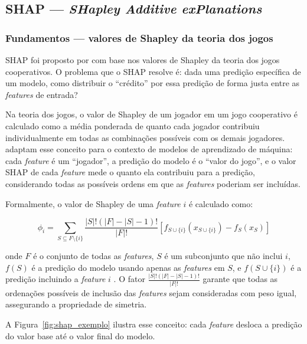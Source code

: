 \documentclass[
    12pt,                %
    openright,           %
    oneside,             %
    a4paper,             %
    english,             %
    brazil               %
]{abntex2}
\begin{document}
\subsection{SHAP — \textit{SHapley Additive exPlanations}}
\label{subsec:shap}

\subsubsection{Fundamentos — valores de Shapley da teoria dos jogos}
\label{subsubsec:shap_fundamentos}

SHAP foi proposto por  com base nos valores 
de Shapley da teoria dos jogos cooperativos. O problema que o SHAP 
resolve é: dada uma predição específica de um modelo, como distribuir 
o ``crédito'' por essa predição de forma justa entre as 
\textit{features} de entrada?

Na teoria dos jogos, o valor de Shapley de um jogador em um jogo 
cooperativo é calculado como a média ponderada de quanto cada jogador 
contribuiu individualmente em todas as combinações possíveis com os 
demais jogadores.  adaptam esse conceito 
para o contexto de modelos de aprendizado de máquina: cada 
\textit{feature} é um ``jogador'', a predição do modelo é o 
``valor do jogo'', e o valor SHAP de cada \textit{feature} mede 
o quanto ela contribuiu para a predição, considerando todas as 
possíveis ordens em que as \textit{features} poderiam ser incluídas.

Formalmente, o valor de Shapley de uma \textit{feature} $i$ 
é calculado como:

\begin{equation}
\phi_i = \sum_{S \subseteq F \setminus \{i\}} 
\frac{|S|!(|F| - |S| - 1)!}{|F|!} 
\left[ f_{S \cup \{i\}}(x_{S \cup \{i\}}) - f_S(x_S) \right]
\end{equation}

onde $F$ é o conjunto de todas as \textit{features}, $S$ é um 
subconjunto que não inclui $i$, $f(S)$ é a predição do modelo 
usando apenas as \textit{features} em $S$, e 
$f(S \cup \{i\})$ é a predição incluindo a \textit{feature} 
$i$ \cite{lundberg2017}. O fator 
$\frac{|S|!(|F| - |S| - 1)!}{|F|!}$ garante que todas as 
ordenações possíveis de inclusão das \textit{features} sejam 
consideradas com peso igual, assegurando a propriedade de 
simetria.

A Figura~\ref{fig:shap_exemplo} ilustra esse conceito: cada 
\textit{feature} desloca a predição do valor base até o 
valor final do modelo.
\end{document}
